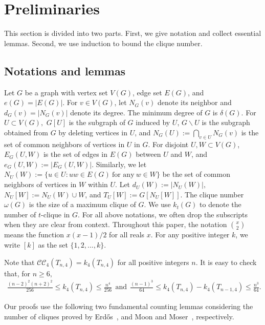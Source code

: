 \documentclass[11pt,a4paper]{article}
\newcommand{\turangraph}[2]{T_{#1,#2}}
\begin{document}
\section{Preliminaries}\label{Sec:Pre}
This section is divided into two parts. 
First, we give notation and collect essential lemmas. 
Second, we use induction to bound the clique number.


\subsection{Notations and lemmas}
Let $G$ be a graph with vertex set $V(G)$, edge set $E(G)$, and $e(G) = |E(G)|$. 
For $v \in V(G)$, let $N_G(v)$ denote its neighbor and $d_G(v) = |N_G(v)|$ denote its degree. 
The minimum degree of $G$ is $\delta(G)$.
For $U\subset V(G),$ 
$G[U]$ is the subgraph of $G$ induced by $U$,
$G\backslash U$ is the subgraph obtained from $G$ by deleting vertices in $U$, and
$N_{G}(U):=\bigcap_{v\in U} N_{G}(v)$ is the set of common neighbors of vertices in $U$ in $G$.
For disjoint $U,W\subset V(G)$,
$E_{G}(U,W)$ is the set of edges in $E(G)$ between $U$ and $W$, and $e_{G}(U,W):=|E_{G}(U,W)|$.
Similarly, we let
$N_U(W):=\{u\in U: uw\in E(G)\ \text{for any}\ w\in W\}$
be the set of common neighbors of vertices in $W$ within $U$.
Let $d_{U}(W):=|N_{U}(W)|,$
$N_U[W]:=N_U(W)\cup W$,
and $T_U[W]:=G[N_U[W]].$
The clique number $\omega(G)$ is the size of a maximum clique of $G$. 
We use $k_{t}(G)$ to denote the number of $t$-clique in $G.$
For all above notations, we often drop the subscripts when they are clear from context.
Throughout this paper, the notation $\binom{x}{2}$ means the function $x(x-1)/2$ for all reals $x$.
For any positive integer $k$, we write $[k]$ as the set $\{1,2,...,k\}$.

Note that $\mathcal{C}\mathcal{C}_4(\turangraph{n}{4})=k_4(\turangraph{n}{4})$ for all positive integers $n$. 
It is easy to check that, for $n\ge 6,$ 
\begin{align}\label{Equ: bound of k4(T(n,4))}
    \frac {(n-2)^2(n+2)^2}{256}\le k_4(\turangraph{n}{4})\le \frac{n^4}{256}\ \  \text{and}\ \ \frac{(n-1)^3}{64}\le k_4(\turangraph{n}{4})-k_4(\turangraph{n-1}{4})\le \frac{n^3}{64}.
\end{align}

Our proofs use the following two fundamental counting lemmas considering the number of cliques proved by Erd\H{o}s~\cite{E62}, and Moon and Moser~\cite{MM}, respectively. 
\end{document}
